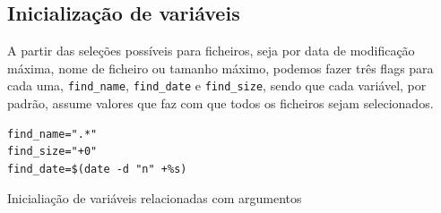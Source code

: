 \subsection{Inicialização de variáveis}
A partir das seleções possíveis para ficheiros, seja por data
de modificação máxima, nome de ficheiro ou tamanho máximo,
podemos fazer três flags para cada uma, \verb|find_name|,
\verb|find_date| e \verb|find_size|, sendo que cada
variável, por padrão, assume valores que faz com que todos
os ficheiros sejam selecionados.

\begin{listing}[H]
\begin{verbatim}
find_name=".*"
find_size="+0"
find_date=$(date -d "n" +%s)
\end{verbatim}
\caption{Inicialiação de variáveis relacionadas com
argumentos}
\end{listing}
